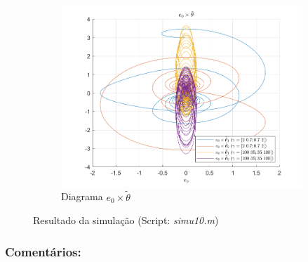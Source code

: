 \documentclass[10pt]{article}
\begin{document}
\begin{figure}[h!]
    \begin{subfigure}[b]{0.3\textwidth}
        \centering
        \includegraphics[width=\textwidth]{img/fig10d.png}
        \caption{Diagrama $e_0 \times \tilde{\theta}$}
    \end{subfigure}

    \caption{Resultado da simulação (Script: \textit{simu10.m})}
    \label{fig:sim10}
\end{figure}

\subsubsection{Comentários:}
\end{document}
